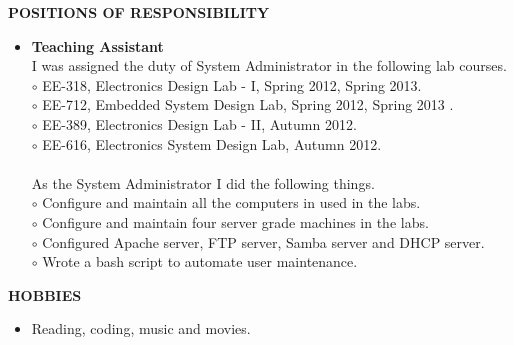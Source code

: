\documentclass[a4paper,10pt]{article}
\begin{document}
 \colorbox{titleColor}{\parbox{6.5in}{\textbf{POSITIONS OF RESPONSIBILITY}}}

 \begin{itemize}
 \setlength{\itemsep}{1pt}
 \item \textbf{Teaching Assistant} \\
I was assigned the duty of System Administrator in the following lab courses.\\
$\circ$ EE-318, Electronics Design Lab - I, Spring 2012, Spring 2013. \\
$\circ$ EE-712, Embedded System Design Lab, Spring 2012, Spring 2013 . \\ 
$\circ$ EE-389, Electronics Design Lab - II, Autumn 2012.  \\
$\circ$ EE-616, Electronics System Design Lab, Autumn 2012. \\
\qquad \\
As the System Administrator I did the following things. \\
$\circ$ Configure and maintain all the computers in used in the labs. \\
$\circ$ Configure and maintain four server grade machines in the labs. \\
$\circ$ Configured Apache server, FTP server, Samba server and DHCP server. \\
$\circ$ Wrote a bash script to automate user maintenance.
 \end{itemize}

 \colorbox{titleColor}{\parbox{6.5in}{\textbf{HOBBIES}}}

  \begin{itemize}
 \setlength{\itemsep}{1pt}
    \item Reading, coding, music and movies.
  \end{itemize}
\end{document}
